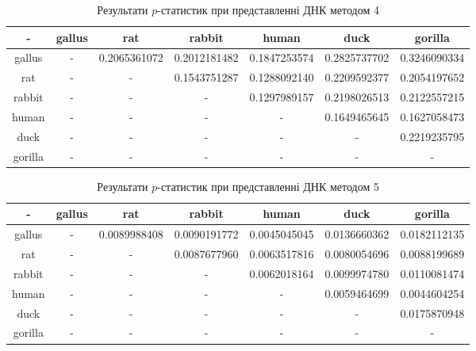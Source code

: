 \documentclass[14pt]{extarticle}
\begin{document}
\begin{table}[h!]
\begin{center}
\begin{tabular}{|c|c|c|c|c|c|c|}
\hline
- & gallus & rat & rabbit & human & duck & gorilla \\ \hline
gallus & - & 0.2065361072 & 0.2012181482 & 0.1847253574 & 0.2825737702 & 0.3246090334 \\ \hline
rat & - & - & 0.1543751287 & 0.1288092140 & 0.2209592377 & 0.2054197652 \\ \hline
rabbit & - & - & - & 0.1297989157 & 0.2198026513 & 0.2122557215 \\ \hline
human & - & - & - & - & 0.1649465645 & 0.1627058473 \\ \hline
duck & - & - & - & - & - & 0.2219235795 \\ \hline
gorilla & - & - & - & - & - & - \\ \hline
\end{tabular}
\end{center}
\caption{Результати $p$-статистик при представленні ДНК методом 4}
\label{table:res4}
\end{table}

\begin{table}[h!]
\begin{center}
\begin{tabular}{|c|c|c|c|c|c|c|}
\hline
- & gallus & rat & rabbit & human & duck & gorilla \\ \hline
gallus & - & 0.0089988408 & 0.0090191772 & 0.0045045045 & 0.0136660362 & 0.0182112135 \\ \hline
rat & - & - & 0.0087677960 & 0.0063517816 & 0.0080054696 & 0.0088199689 \\ \hline
rabbit & - & - & - & 0.0062018164 & 0.0099974780 & 0.0110081474 \\ \hline
human & - & - & - & - & 0.0059464699 & 0.0044604254 \\ \hline
duck & - & - & - & - & - & 0.0175870948 \\ \hline
gorilla & - & - & - & - & - & - \\ \hline
\end{tabular}
\end{center}
\caption{Результати $p$-статистик при представленні ДНК методом 5}
\label{table:res5}
\end{table}
\end{document}
